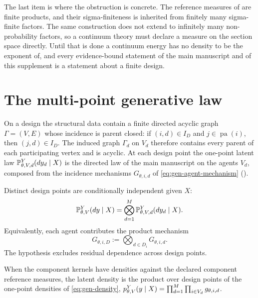 The last item is where the obstruction is concrete. The reference measures of
 are finite products, and their sigma-finiteness is inherited from finitely
many sigma-finite factors. The same construction does not extend to infinitely many
non-probability factors, so a continuum theory must declare a measure on the section space directly.
Until that is done a continuum energy has no density to be the exponent of, and every evidence-bound
statement of the main manuscript and of this supplement is a statement about a finite design.

\section{The multi-point generative law}
\label{sec:gen-multi-point-law}

On a design the structural data contain a finite directed acyclic graph \(\Gamma=(V,E)\) whose
incidence is parent closed: if \((i,d)\in I_D\) and \(j\in\operatorname{pa}(i)\), then
\((j,d)\in I_D\). The induced graph \(\Gamma_d\) on \(V_d\) therefore contains every parent of each
participating vertex and is acyclic. At each design point the one-point latent law
\(\mathbb P_{\theta,V,d}^{Y}(dy_d\mid X)\) is the directed law of the main manuscript on the agents
\(V_d\), composed from the incidence mechanisms \(G_{\theta,i,d}\) of \eqref{eq:gen-agent-mechanism}
().

Distinct design points are conditionally independent given \(X\):
\begin{equation}
\mathbb P_{\theta,V}^{Y}(dy\mid X)
=\bigotimes_{d=1}^{M}\mathbb P_{\theta,V,d}^{Y}(dy_d\mid X).
\label{eq:gen-design-product}
\end{equation}
Equivalently, each agent contributes the product mechanism
\begin{equation}
G_{\theta,i,D}:=\bigotimes_{d\in D_i}G_{\theta,i,d}.
\label{eq:gen-design-agent-mechanism}
\end{equation}
The hypothesis excludes residual dependence across design points.

When the component kernels have densities against the declared component reference measures, the
latent density is the product over design points of the one-point densities of
\eqref{eq:gen-density}, \(p_{\theta,V}^Y(y\mid X)=\prod_{d=1}^{M}\prod_{i\in V_d}g_{\theta,i,d}\).

